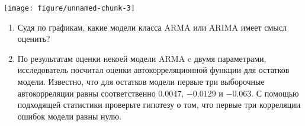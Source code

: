 \begin{problem}
\begin{knitrout}
\color{fgcolor}\begin{kframe}
\begin{alltt}
 \hlstd{(}      \hlopt{+} \hlstd{(} \hlstd{=} \hlstd{,}
     \hlstd{=} \hlstd{)} \hlopt{+} \hlstd{(}\hlstd{)} \hlopt{+} \hlstd{(}\hlstd{)} \hlopt{+}
    \hlstd{(} \hlstd{=} \hlstd{(} \hlstd{=} \hlstd{))} \hlopt{+} \hlstd{(} \hlstd{=} \hlopt{/}\hlstd{(} \hlopt{+}
    \hlstd{(} \hlstd{=} \hlopt{-}\hlopt{/}\hlstd{(}
\end{alltt}
\end{kframe}
\texttt{[image: figure/unnamed-chunk-3]} 

\end{knitrout}



\begin{enumerate}
\item Судя по графикам, какие модели класса ARMA или ARIMA имеет смысл оценить?
\item По результатам оценки некоей модели ARMA c двумя параметрами, исследователь посчитал оценки автокорреляционной функции для остатков модели. Известно, что для остатков модели первые три выборочные автокорреляции равны соответственно $0.0047$, $-0.0129$ и $-0.063$. С помощью подходящей статистики проверьте гипотезу о том, что первые три корреляции ошибок модели равны нулю.
\end{enumerate}
\end{problem}

